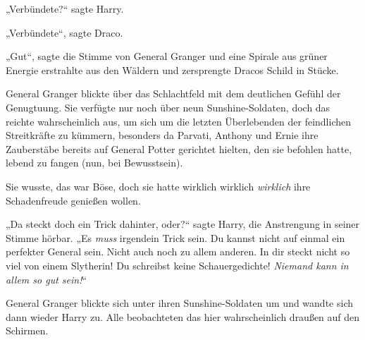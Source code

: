 „Verbündete?“ sagte Harry.

„Verbündete“, sagte Draco.

„Gut“, sagte die Stimme von General Granger und eine Spirale aus grüner Energie erstrahlte aus den Wäldern und zersprengte Dracos Schild in Stücke.

\later

General Granger blickte über das Schlachtfeld mit dem deutlichen Gefühl der Genugtuung. Sie verfügte nur noch über neun Sunshine-Soldaten, doch das reichte wahrscheinlich aus, um sich um die letzten Überlebenden der feindlichen Streitkräfte zu kümmern, besonders da Parvati, Anthony und Ernie ihre Zauberstäbe bereits auf General Potter gerichtet hielten, den sie befohlen hatte, lebend zu fangen (nun, bei Bewusstsein).

Sie wusste, das war Böse, doch sie hatte wirklich wirklich \emph{wirklich} ihre Schadenfreude genießen wollen.

„Da steckt doch ein Trick dahinter, oder?“ sagte Harry, die Anstrengung in seiner Stimme hörbar.
„Es \emph{muss} irgendein Trick sein. Du kannst nicht auf einmal ein perfekter General sein. Nicht auch noch zu allem anderen. In dir steckt nicht so viel von einem Slytherin! Du schreibst keine Schauergedichte! \emph{Niemand kann in allem so gut sein!}“

General Granger blickte sich unter ihren Sunshine-Soldaten um und wandte sich dann wieder Harry zu. Alle beobachteten das hier wahrscheinlich draußen auf den Schirmen.

